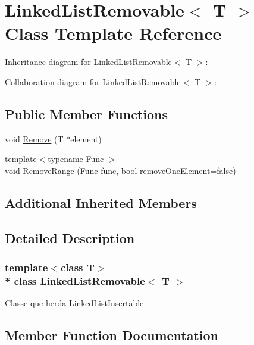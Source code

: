 \hypertarget{class_linked_list_removable}{}\section{Linked\+List\+Removable$<$ T $>$ Class Template Reference}
\label{class_linked_list_removable}


Inheritance diagram for Linked\+List\+Removable$<$ T $>$\+:


Collaboration diagram for Linked\+List\+Removable$<$ T $>$\+:
\subsection*{Public Member Functions}
\begin{DoxyCompactItemize}
\item 
void \hyperlink{class_linked_list_removable_a46e128a70fba9dc2dd407989a28ae8e4}{Remove} (T $\ast$element)
\item 
{\footnotesize template$<$typename Func $>$ }\\void \hyperlink{class_linked_list_removable_a673952e058331ad92aaaa243e32a9721}{Remove\+Range} (Func func, bool remove\+One\+Element=false)
\end{DoxyCompactItemize}
\subsection*{Additional Inherited Members}


\subsection{Detailed Description}
\subsubsection*{template$<$class T$>$\\*
class Linked\+List\+Removable$<$ T $>$}

Classe que herda \hyperlink{class_linked_list_insertable}{Linked\+List\+Insertable} 

\subsection{Member Function Documentation}
